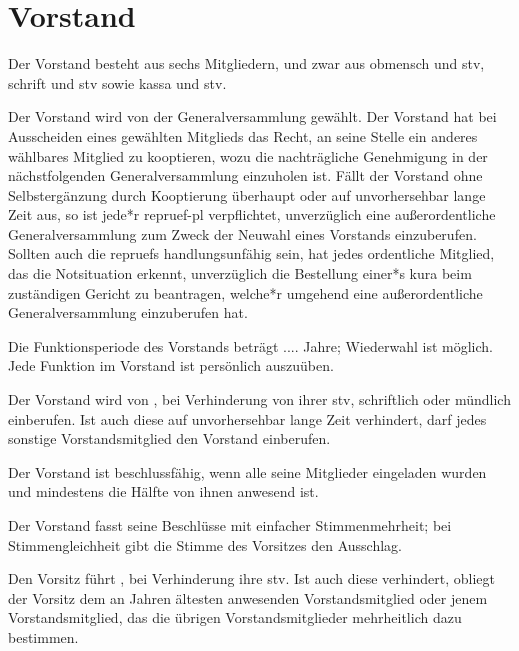 \documentclass{article}
\begin{document}
\section{Vorstand}\label{vorstand}
\begin{absatz}
    \item Der Vorstand besteht aus sechs Mitgliedern, und zwar aus \gls{obmensch} und \gls{stv}, \gls{schrift} und \gls{stv} sowie \gls{kassa} und \gls{stv}.
    \item \label{vorstand-wahl} Der Vorstand wird von der Generalversammlung gewählt. Der Vorstand hat bei Ausscheiden eines gewählten Mitglieds das Recht, an seine Stelle ein anderes wählbares Mitglied zu kooptieren, wozu die nachträgliche Genehmigung in der nächstfolgenden Generalversammlung einzuholen ist. Fällt der Vorstand ohne Selbstergänzung durch Kooptierung überhaupt oder auf unvorhersehbar lange Zeit aus, so ist jede*r \gls{repruef-pl} verpflichtet, unverzüglich eine außerordentliche Generalversammlung zum Zweck der Neuwahl eines Vorstands einzuberufen. Sollten auch die \glspl{repruef} handlungsunfähig sein, hat jedes ordentliche Mitglied, das die Notsituation erkennt, unverzüglich die Bestellung einer*s \gls{kura} beim zuständigen Gericht zu beantragen, welche*r umgehend eine außerordentliche Generalversammlung einzuberufen hat.
    \item \label{vorstand-periode} Die Funktionsperiode des Vorstands beträgt
     ....  Jahre; Wiederwahl ist möglich. Jede Funktion im Vorstand ist persönlich auszuüben.
     \item Der Vorstand wird von , bei Verhinderung von ihrer \gls{stv}, schriftlich oder mündlich einberufen. Ist auch diese auf unvorhersehbar lange Zeit verhindert, darf jedes sonstige Vorstandsmitglied den Vorstand einberufen.
     \item Der Vorstand ist beschlussfähig, wenn alle seine Mitglieder eingeladen wurden und mindestens die Hälfte von ihnen anwesend ist.
     \item Der Vorstand fasst seine Beschlüsse mit einfacher Stimmenmehrheit; bei Stimmengleichheit gibt die Stimme des Vorsitzes den Ausschlag.
     \item Den Vorsitz führt , bei Verhinderung ihre \gls{stv}. Ist auch diese verhindert, obliegt der Vorsitz dem an Jahren ältesten anwesenden Vorstandsmitglied oder jenem Vorstandsmitglied, das die übrigen Vorstandsmitglieder mehrheitlich dazu bestimmen.

\end{absatz}
\end{document}
